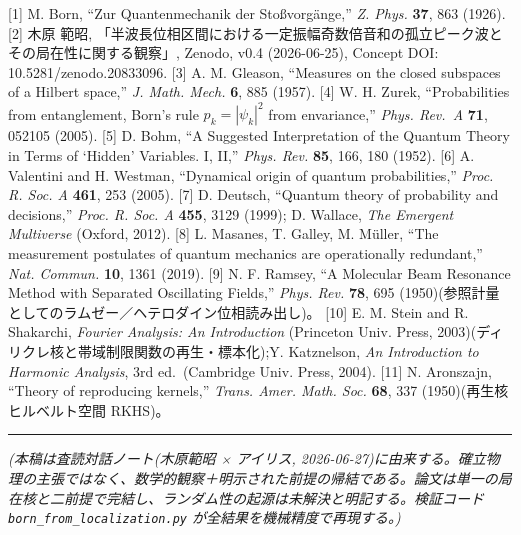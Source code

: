 \documentclass[
]{ltjsarticle}
\begin{document}
{[}1{]} M. Born, ``Zur Quantenmechanik der Stoßvorgänge,'' \emph{Z.
Phys.} \textbf{37}, 863 (1926). {[}2{]} 木原 範昭,
「半波長位相区間における一定振幅奇数倍音和の孤立ピーク波とその局在性に関する観察」,
Zenodo, v0.4 (2026-06-25), Concept DOI: 10.5281/zenodo.20833096. {[}3{]}
A. M. Gleason, ``Measures on the closed subspaces of a Hilbert space,''
\emph{J. Math. Mech.} \textbf{6}, 885 (1957). {[}4{]} W. H. Zurek,
``Probabilities from entanglement, Born's rule \(p_k=|\psi_k|^2\) from
envariance,'' \emph{Phys. Rev.~A} \textbf{71}, 052105 (2005). {[}5{]} D.
Bohm, ``A Suggested Interpretation of the Quantum Theory in Terms of
`Hidden' Variables. I, II,'' \emph{Phys. Rev.} \textbf{85}, 166, 180
(1952). {[}6{]} A. Valentini and H. Westman, ``Dynamical origin of
quantum probabilities,'' \emph{Proc. R. Soc. A} \textbf{461}, 253
(2005). {[}7{]} D. Deutsch, ``Quantum theory of probability and
decisions,'' \emph{Proc. R. Soc. A} \textbf{455}, 3129 (1999); D.
Wallace, \emph{The Emergent Multiverse} (Oxford, 2012). {[}8{]} L.
Masanes, T. Galley, M. Müller, ``The measurement postulates of quantum
mechanics are operationally redundant,'' \emph{Nat. Commun.}
\textbf{10}, 1361 (2019). {[}9{]} N. F. Ramsey, ``A Molecular Beam
Resonance Method with Separated Oscillating Fields,'' \emph{Phys. Rev.}
\textbf{78}, 695
(1950)(参照計量としてのラムゼー／ヘテロダイン位相読み出し)。 {[}10{]} E.
M. Stein and R. Shakarchi, \emph{Fourier Analysis: An Introduction}
(Princeton Univ. Press,
2003)(ディリクレ核と帯域制限関数の再生・標本化);Y. Katznelson, \emph{An
Introduction to Harmonic Analysis}, 3rd ed.~(Cambridge Univ. Press,
2004). {[}11{]} N. Aronszajn, ``Theory of reproducing kernels,''
\emph{Trans. Amer. Math. Soc.} \textbf{68}, 337
(1950)(再生核ヒルベルト空間 RKHS)。

\begin{center}\rule{0.5\linewidth}{0.5pt}\end{center}

\emph{(本稿は査読対話ノート(木原範昭 × アイリス,
2026-06-27)に由来する。確立物理の主張ではなく、数学的観察＋明示された前提の帰結である。論文は単一の局在核と二前提で完結し、ランダム性の起源は未解決と明記する。検証コード
\texttt{born\_from\_localization.py} が全結果を機械精度で再現する。)}
\end{document}
